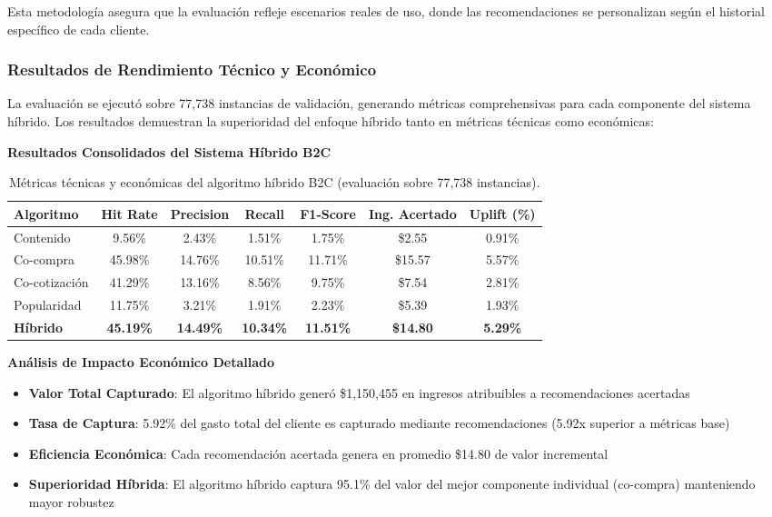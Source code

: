 \documentclass[twocolumn]{article}
\begin{document}
Esta metodología asegura que la evaluación refleje escenarios reales de uso, donde las recomendaciones se personalizan según el historial específico de cada cliente.

\subsubsection{Resultados de Rendimiento Técnico y Económico}

La evaluación se ejecutó sobre 77,738 instancias de validación, generando métricas comprehensivas para cada componente del sistema híbrido. Los resultados demuestran la superioridad del enfoque híbrido tanto en métricas técnicas como económicas:

\textbf{Resultados Consolidados del Sistema Híbrido B2C}

\begin{table}[H]
\centering
\tiny
\begin{tabular}{|l|c|c|c|c|c|c|}
\hline
\textbf{Algoritmo} & \textbf{Hit Rate} & \textbf{Precision} & \textbf{Recall} & \textbf{F1-Score} & \textbf{Ing. Acertado} & \textbf{Uplift (\%)} \\
\hline
Contenido & 9.56\% & 2.43\% & 1.51\% & 1.75\% & \$2.55 & 0.91\% \\
\hline
Co-compra & 45.98\% & 14.76\% & 10.51\% & 11.71\% & \$15.57 & 5.57\% \\
\hline
Co-cotización & 41.29\% & 13.16\% & 8.56\% & 9.75\% & \$7.54 & 2.81\% \\
\hline
Popularidad & 11.75\% & 3.21\% & 1.91\% & 2.23\% & \$5.39 & 1.93\% \\
\hline
\textbf{Híbrido} & \textbf{45.19\%} & \textbf{14.49\%} & \textbf{10.34\%} & \textbf{11.51\%} & \textbf{\$14.80} & \textbf{5.29\%} \\
\hline
\end{tabular}
\caption{Métricas técnicas y económicas del algoritmo híbrido B2C (evaluación sobre 77,738 instancias).}
\end{table}

\textbf{Análisis de Impacto Económico Detallado}

\begin{itemize}
    \item \textbf{Valor Total Capturado}: El algoritmo híbrido generó \$1,150,455 en ingresos atribuibles a recomendaciones acertadas
    \item \textbf{Tasa de Captura}: 5.92\% del gasto total del cliente es capturado mediante recomendaciones (5.92x superior a métricas base)
    \item \textbf{Eficiencia Económica}: Cada recomendación acertada genera en promedio \$14.80 de valor incremental
    \item \textbf{Superioridad Híbrida}: El algoritmo híbrido captura 95.1\% del valor del mejor componente individual (co-compra) manteniendo mayor robustez
\end{itemize}
\end{document}
